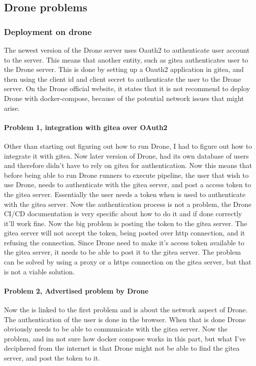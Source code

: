 \subsection{Drone problems}
\label{sec:discussion-drone}

\subsubsection{Deployment on drone}
The newest version of the Drone server uses Oauth2 to authenticate user account to the server.
This means that another entity, such as gitea authenticates user to the Drone server. This is done by
setting up a Oauth2 application in gitea, and then using the client id and client secret to authenticate
the user to the Drone server. On the Drone official website, it states that it is not recommend to deploy 
Drone with docker-compose, because of the potential network issues that might arise.
\paragraph{Problem 1, integration with gitea over OAuth2}
Other than starting out figuring out how to run Drone, I had to figure out how to integrate it with gitea.
Now later version of Drone, had its own database of users and therefore didn't have to rely on gitea for authentication.
Now this means that before being able to run Drone runners to execute pipeline, the user that wish to use Drone,
needs to authenticate with the gitea server, and post a access token to the gitea server. Essentially the user needs a token 
when is used to authenticate with the gitea server.
Now the authentication process is not a problem, the Drone CI/CD documentation is very specific about how to do it and if done 
correctly it'll work fine.
Now the big problem is posting the token to the gitea server. The gitea server will not accept the token, being posted over http connection,
and it refusing the connection. 
Since Drone need to make it's access token available to the gitea server, it needs to be able to post it to the gitea server.
The problem can be solved by using a proxy or a https connection on the gitea server, but that is not a viable solution.

\paragraph{Problem 2, Advertised problem by Drone}
Now the is linked to the first problem and is about the network aspect of Drone.
The authentication of the user is done in the browser. When that is done Drone obviously needs to be able to communicate with the gitea server.
Now the problem, and im not sure how docker compose works in this part, but what I've deciphered from the internet is that 
Drone might not be able to find the gitea server, and post the token to it.

